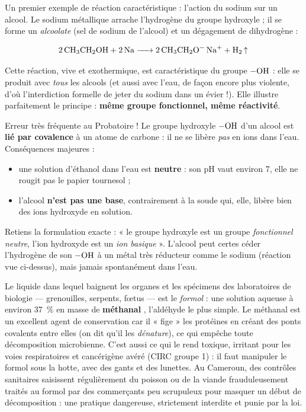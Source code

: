 \documentclass[11pt]{article}
\begin{document}
Un premier exemple de réaction caractéristique : l'action du sodium sur un alcool. Le sodium métallique  arrache l'hydrogène du groupe hydroxyle ; il se forme un \emph{alcoolate} (sel de sodium de l'alcool) et un dégagement de dihydrogène :

\[ \ce{2 CH3CH2OH + 2 Na -> 2 CH3CH2O- Na+ + H2 ^} \]

Cette réaction, vive et exothermique, est caractéristique du groupe $-\ce{OH}$ : elle se produit avec \emph{tous} les alcools (et aussi avec l'eau, de façon encore plus violente, d'où l'interdiction formelle de jeter du sodium dans un évier !). Elle illustre parfaitement le principe : \textbf{même groupe fonctionnel, même réactivité}.

\begin{attention}
Erreur très fréquente au Probatoire ! Le groupe hydroxyle $-\ce{OH}$ d'un alcool est \textbf{lié par covalence} à un atome de carbone : il ne se libère \emph{pas} en ions  dans l'eau. Conséquences majeures :
\begin{itemize}
\item une solution d'éthanol dans l'eau est \textbf{neutre} : son pH vaut environ 7, elle ne rougit pas le papier tournesol ;
\item l'alcool \textbf{n'est pas une base}, contrairement à la soude  qui, elle, libère bien des ions hydroxyde  en solution.
\end{itemize}
Retiens la formulation exacte : « le groupe hydroxyle est un groupe \emph{fonctionnel neutre}, l'ion hydroxyde est un \emph{ion basique} ». L'alcool peut certes céder l'hydrogène de son $-\ce{OH}$ à un métal très réducteur comme le sodium (réaction vue ci-dessus), mais jamais spontanément dans l'eau.
\end{attention}

\begin{savaistu}
Le liquide dans lequel baignent les organes et les spécimens des laboratoires de biologie — grenouilles, serpents, fœtus — est le \emph{formol} : une solution aqueuse à environ \SI{37}{\%} en masse de \textbf{méthanal} , l'aldéhyde le plus simple. Le méthanal est un excellent agent de conservation car il « fige » les protéines en créant des ponts covalents entre elles (on dit qu'il les \emph{dénature}), ce qui empêche toute décomposition microbienne. C'est aussi ce qui le rend toxique, irritant pour les voies respiratoires et cancérigène avéré (CIRC groupe 1) : il faut manipuler le formol sous la hotte, avec des gants et des lunettes. Au Cameroun, des contrôles sanitaires saisissent régulièrement du poisson ou de la viande frauduleusement traités au formol par des commerçants peu scrupuleux pour masquer un début de décomposition : une pratique dangereuse, strictement interdite et punie par la loi.
\end{savaistu}
\end{document}
